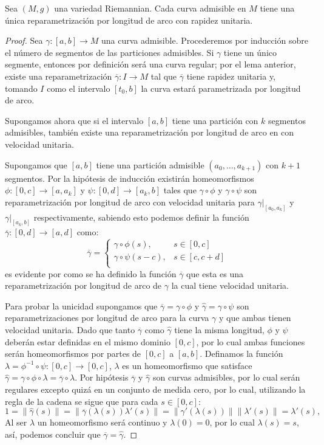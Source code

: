 \begin{lemma}
	Sea $(M,g)$ una variedad Riemannian. Cada curva admisible en $M$ tiene una única reparametrización por longitud de arco con rapidez unitaria.
\end{lemma}

\begin{proof}
	Sea $\gamma: [a,b] \to M$ una curva admisible. Procederemos por inducción sobre el número de segmentos de las particiones admisibles. Si $\gamma$ tiene un único segmente, entonces por definición será una curva regular; por el lema anterior, existe una reparametrización $\overline{\gamma}: I \to M$ tal que $\overline{\gamma}$ tiene rapidez unitaria y, tomando $I$ como el intervalo $[t_0, b]$ la curva estará parametrizada por longitud de arco.

	Supongamos ahora que si el intervalo $[a,b]$ tiene una partición con $k$ segmentos admisibles, también existe una reparametrización por longitud de arco en con velocidad unitaria.

	Supongamos que $[a,b]$ tiene una partición admisible $(a_0, \ldots, a_{k+1})$ con $k+1$ segmentos. Por la hipótesis de inducción existirán homeomorfismos $\phi : [0,c] \to [a, a_{k}]$ y $\psi: [0,d] \to [a_k, b]$ tales que $\gamma \circ \phi$ y $\gamma \circ \psi$ son reparametrización por longitud de arco con velocidad unitaria para $\gamma|_{[a_0,a_k]}$ y $\gamma|_{[a_k,b]}$ respectivamente, sabiendo esto podemos definir la función $\overline{\gamma}: [0,d] \to [a,d]$ como:
	\[
		\overline{\gamma} = \begin{cases}
			\gamma \circ \phi (s),   & s \in [0,c]      \\
			\gamma \circ \psi (s-c), & s \in [c, c + d] \\
		\end{cases}
	\]
	es evidente por como se ha definido la función $\overline{\gamma}$ que esta es una reparametrización por longitud de arco de $\gamma$ la cual tiene velocidad unitaria.

	Para probar la unicidad supongamos que $\overline{\gamma} = \gamma \circ \phi$ y $\hat{\gamma} = \gamma \circ \psi$ son reparametrizaciones por longitud de arco para la curva $\gamma$ y que ambas tienen velocidad unitaria. Dado que tanto $\overline{\gamma}$ como $\hat{\gamma}$ tiene la misma longitud, $\phi$ y $\psi$ deberán estar definidas en el mismo dominio $[0,c]$, por lo cual ambas funciones serán homeomorfismos por partes de $[0,c]$ a $[a,b]$. Definamos la función $\lambda = \phi^{-1} \circ \psi : [0,c] \to [0,c]$, $\lambda$ es un homeomorfismo que satisface $\hat{\gamma} = \gamma \circ \phi \circ \lambda = \overline{\gamma} \circ \lambda$. Por hipótesis $\overline{\gamma}$ y $\hat{\gamma}$ son curvas admisibles, por lo cual serán regulares excepto quizá en un conjunto de medida cero, por lo cual, utilizando la regla de la cadena se sigue que para cada $s \in [0,c]$:
	\[
		1 = \| \hat{\gamma}(s)\| = \|\overline{\gamma}(\lambda(s)) \lambda'(s)\| = \|\gamma'(\lambda(s)) \| \| \lambda'(s) \| = \lambda'(s),
	\]
	Al ser $\lambda$ un homeomorfismo será continuo y $\lambda(0) = 0$, por lo cual $\lambda(s) = s$, así, podemos concluir que $\overline{\gamma} = \hat{\gamma}$.
\end{proof}

